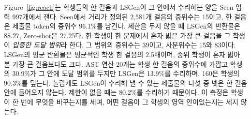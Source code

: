 \documentclass[10pt,conference]{IEEEtran}
\begin{document}
Figure~\ref{fig:reach}는 학생들의 한 걸음과 LSGen이 그 안에서 수리하는 양을 Seen 입력 997개에서 잰다. Seen에서 거리가 정의된 2,581개 걸음의 중위수는 15이고, 한 걸음은 제출물 token의 중위수 96.1\%를 남긴다. 제한을 두지 않을 때 LSGen의 반환물은 88.27, Zero-shot은 27.25다. 한 학생이 한 문제에서 혼자 밟은 가장 큰 걸음을 그 학생이 \emph{입증한 도달 범위}라 한다. 그 범위의 중위수는 39이고, 사분위수는 15와 83이다. LSGen의 평균 반환물은 평균적인 학생 한 걸음의 2.5배이며, 중위 학생이 혼자 밟아 본 가장 큰 걸음보다도 크다. AST 연산 20개는 학생 한 걸음의 중위수에 가깝고 학생의 30.9\%가 그 안에 도달 범위를 두지만 LSGen은 13.9\%를 수리하며, 160은 학생의 90.3\%를 덮는다. 놀랍게도 LSGen이 수리해 낼 수 있는 제출물의 다섯 중 넷은 한 걸음 안에 들어오지 않는다. 제한이 없을 때는 80.2\%를 수리하기 때문이다. 이 측정은 학생이 한 번에 무엇을 바꾸는지를 세며, 어떤 걸음이 그 학생의 영역 안이었는지는 세지 않는다.
\end{document}
